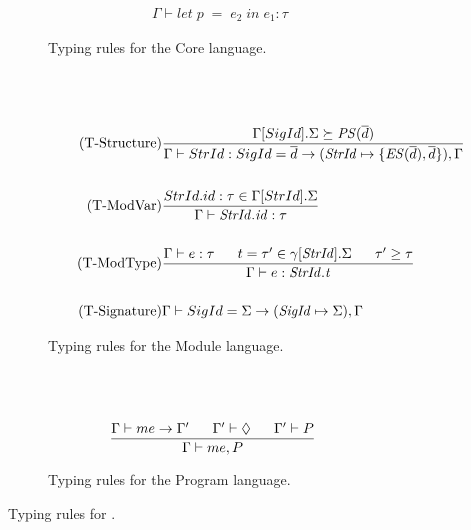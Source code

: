 \begin{figure}[htbp]
\begin{subfigure}{\textwidth}
\begin{align*}
{\Gamma \vdash let\;p\;=\;e_{2}\;in\;e_{1}:\tau}
\end{align*}
\caption{Typing rules for the Core language. \label{fig:TypeRulesCore}}
\end{subfigure}
\\ \\
\begin{subfigure}{\textwidth}
\begin{align*}
\tag{T-Structure}
&\frac
{\Gamma[SigId].\Sigma \succeq \mathit{PS}(\overline{d})}
{\Gamma \vdash StrId : SigId = \overline{d} \rightarrow (\mathit{StrId} \mapsto \lbrace \mathit{ES}(\overline{d}), \overline{d}\rbrace),\Gamma}
\\
\\
\tag{T-ModVar}
&\frac
{StrId.id:\tau \in \Gamma[StrId].\Sigma}
{\Gamma \vdash \mathit{StrId.id} : \tau}
\\
\\
\tag{T-ModType}
&
\frac
{\Gamma \vdash e:\tau \;\;\;\;\;\; t = \tau' \in \gamma[\mathit{StrId}].\Sigma \;\;\;\;\;\; \tau' \geq \tau}
{\Gamma \vdash e : \mathit{StrId.t}}
\\
\\
\tag{T-Signature}
&\Gamma \vdash SigId = \Sigma \rightarrow (\mathit{SigId} \mapsto \Sigma),\Gamma
\end{align*}
\caption{Typing rules for the Module language. \label{fig:TypeRulesModule}}
\end{subfigure}
\\ \\
\begin{subfigure}{\textwidth}

\begin{align*}
&\frac
{\Gamma \vdash me \rightarrow \Gamma' \;\;\;\;\;\; \Gamma' \vdash \Diamond \;\;\;\;\;\; \Gamma' \vdash P}
{\Gamma \vdash me, P}
\end{align*}
\caption{Typing rules for the Program language. \label{fig:TypeRulesProgram}}
\end{subfigure}
\caption{Typing rules for \MiniML.}
\end{figure}


